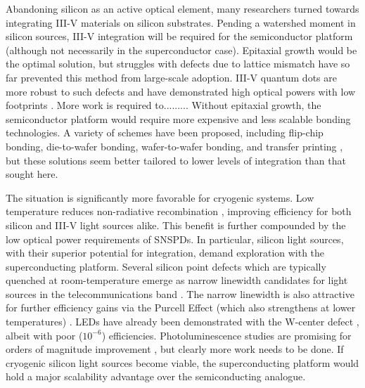 \documentclass[twocolumn]{article}
\begin{document}
Abandoning silicon as an active optical element, many researchers turned towards integrating III-V materials on silicon substrates. Pending a watershed moment in silicon sources, III-V integration will be required for the semiconductor platform (although not necessarily in the superconductor case). Epitaxial growth would be the optimal solution, but struggles with defects due to lattice mismatch have so far prevented this method from large-scale adoption. III-V quantum dots are more robust to such defects and have demonstrated high optical powers with low footprints \cite{jung2017high, norman2018perspective}. More work is required to......... Without epitaxial growth, the semiconductor platform would require more expensive and less scalable bonding technologies. A variety of schemes have been proposed, including flip-chip bonding, die-to-wafer bonding, wafer-to-wafer bonding, and transfer printing \cite{zhang2019iii,more,references,jeff,has,a,bunch}, but these solutions seem better tailored to lower levels of integration than that sought here.

The situation is significantly more favorable for cryogenic systems. Low temperature reduces non-radiative recombination \cite{}, improving efficiency for both silicon and III-V light sources alike. This benefit is further compounded by the low optical power requirements of SNSPDs. In particular, silicon light sources, with their superior potential for integration, demand exploration with the superconducting platform. Several silicon point defects which are typically quenched at room-temperature emerge as narrow linewidth candidates for light sources in the telecommunications band \cite{davies1989optical}. The narrow linewidth is also attractive for further efficiency gains via the Purcell Effect (which also strengthens at lower temperatures) \cite{romeira2018purcell}. LEDs have already been demonstrated with the W-center defect \cite{buckley2017all, bao2007point}, albeit with poor ($10^{-6}$) efficiencies. Photoluminescence studies are promising for orders of magnitude improvement \cite{buckley2020optimization}, but clearly more work needs to be done. If cryogenic silicon light sources become viable, the superconducting platform would hold a major scalability advantage over the semiconducting analogue. 
\end{document}
